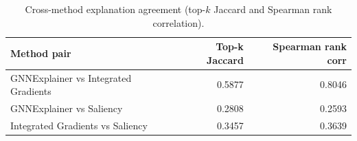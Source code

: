 \begin{table}[t]
\centering
\caption{Cross-method explanation agreement (top-$k$ Jaccard and Spearman rank correlation).}
\label{tab:xai_agree}
\footnotesize
\begin{tabular}{lrr}
\toprule
Method pair & Top-k Jaccard & Spearman rank corr \\
\midrule
GNNExplainer vs Integrated Gradients & 0.5877 & 0.8046 \\
GNNExplainer vs Saliency & 0.2808 & 0.2593 \\
Integrated Gradients vs Saliency & 0.3457 & 0.3639 \\
\bottomrule
\end{tabular}
\end{table}
